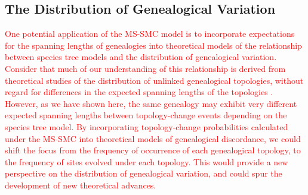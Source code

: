 \documentclass[11pt]{article}
\begin{document}

\subsection{The Distribution of Genealogical Variation}

\textcolor{red}{
One potential application of the MS-SMC model is to incorporate expectations
for the spanning lengths of genealogies into theoretical models of the
relationship between species tree models and the distribution of
genealogical variation.
% 
Consider that much of our understanding of this relationship is derived
from theoretical studies of the distribution of unlinked genealogical
topologies, without regard for differences in the expected spanning 
lengths of the topologies
\citep{degnan2005gene,degnan2006discordance}.
% 
However, as we have shown here, the same genealogy may exhibit 
very different expected spanning lengths between topology-change events
depending on the species tree model.
% 
By incorporating topology-change probabilities calculated under the
MS-SMC into theoretical models of genealogical discordance, we could shift
the focus from the frequency of occurrence of each genealogical topology, 
to the frequency of sites evolved under each topology. This would provide
a new perspective on the distribution of genealogical variation, and could
spur the development of new theoretical advances.
% 
% 
}
\end{document}
